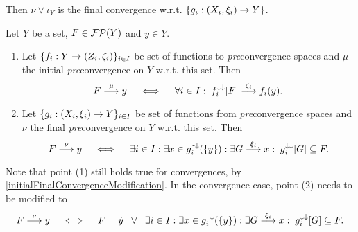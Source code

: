 Then $\nu \vee \iota_Y$ is the final convergence w.r.t. $\{g_i: \sSet{X_i, \xi_i} \to Y\}$.


\begin{proposition} \label{initialFinalConvergence}
Let $Y$ be a set, $F\in \operatorname{\mathcal{FP}}(Y)$ and $y\in Y$.
\begin{enumerate}
\item Let $\{f_i: Y\to \sSet{Z_i, \zeta_i}\}_{i\in I}$ be set of functions to \emph{pre}convergence spaces and $\mu$ the initial \emph{pre}convergence on $Y$ w.r.t. this set. Then
\[ F \overset{\mu}{\longrightarrow} y \quad\iff\quad \forall i\in I: \; f_i^{\downarrow\downarrow}[F] \overset{\zeta_i}{\longrightarrow} f_i(y). \]
\item Let $\{g_i: \sSet{X_i, \xi_i} \to Y\}_{i\in I}$ be set of functions from \emph{pre}convergence spaces and $\nu$ the final \emph{pre}convergence on $Y$ w.r.t. this set. Then
\[ F \overset{\nu}{\longrightarrow} y \quad\iff\quad \exists i\in I: \exists x\in g_i^{\text{\hspace{0.15em}-}\downarrow}(\{y\}):  \exists G \overset{\xi_i}{\longrightarrow} x: \; g_i^{\downarrow\downarrow}[G] \subseteq F. \]
\end{enumerate}
\end{proposition}
Note that point (1) still holds true for convergences, by \ref{initialFinalConvergenceModification}. In the convergence case, point (2) needs to be modified to 
\[ F \overset{\nu}{\longrightarrow} y \quad\iff\quad F = \dot{y} \;\;\lor\;\; \exists i\in I: \exists x\in g_i^{\text{\hspace{0.15em}-}\downarrow}(\{y\}):  \exists G \overset{\xi_i}{\longrightarrow} x: \; g_i^{\downarrow\downarrow}[G] \subseteq F. \]
